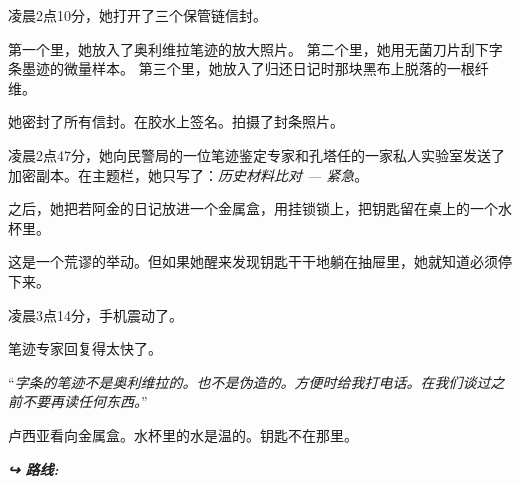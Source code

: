 {\noindent 凌晨2点10分，她打开了三个保管链信封。

\noindent 第一个里，她放入了奥利维拉笔迹的放大照片。
\noindent 第二个里，她用无菌刀片刮下字条墨迹的微量样本。
\noindent 第三个里，她放入了归还日记时那块黑布上脱落的一根纤维。

\noindent 她密封了所有信封。在胶水上签名。拍摄了封条照片。

\noindent 凌晨2点47分，她向民警局的一位笔迹鉴定专家和孔塔任的一家私人实验室发送了加密副本。在主题栏，她只写了：\textit{历史材料比对 --- 紧急}。

\noindent 之后，她把若阿金的日记放进一个金属盒，用挂锁锁上，把钥匙留在桌上的一个水杯里。

\noindent 这是一个荒谬的举动。但如果她醒来发现钥匙干干地躺在抽屉里，她就知道必须停下来。

\noindent 凌晨3点14分，手机震动了。

\noindent 笔迹专家回复得太快了。

\noindent \textquotedblleft{\textit{字条的笔迹不是奥利维拉的。也不是伪造的。方便时给我打电话。在我们谈过之前不要再读任何东西。}\textquotedblright}

\noindent 卢西亚看向金属盒。水杯里的水是温的。钥匙不在那里。

\vspace{0.5em}
\noindent\textit{\textbf{↪ 路线:}  \rotasep {} \rotasep {}}
}
